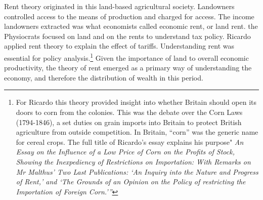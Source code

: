 Rent theory originated in this land-based agricultural society. Landowners controlled access to the means of production and charged for access. The income landowners extracted was what economists called \gls{economic rent}, or \gls{land rent}. the Physiocrats focused on land and on the rents to understand tax policy. Ricardo applied rent theory to  explain the effect of tariffs. Understanding rent was essential for policy analysis.\footnote{For Ricardo this theory provided insight into whether Britain should open its doors to corn from the colonies. This was the debate over the Corn Laws (1794-1846), a set duties on grain imports into Britain to protect British agriculture from outside competition. In Britain, ``corn'' was the generic name for cereal crops. The full title of Ricardo's essay explains his purpose" \textit{An Essay on the Influence of a Low Price of Corn on the Profits of Stock, Showing the Inexpediency of Restrictions on Importation: With Remarks on Mr Malthus' Two Last Publications: `An Inquiry into the Nature and Progress of Rent,' and `The Grounds of an Opinion on the Policy of restricting the Importation of Foreign Corn.'''}} %
Given the importance of land to overall economic productivity, the theory of rent emerged as a primary way of understanding the economy, and therefore the distribution of wealth in this period. 



